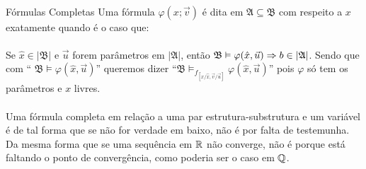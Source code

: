             \paragraph{}
            \begin{definition}{Fórmulas Completas}
                    Uma fórmula $\varphi(x;\vec{v})$ é dita  
                    em $\mathfrak A\subseteq\mathfrak{B}$ com respeito a $x$ 
                    exatamente quando é o caso que:
                \paragraph{}
                    Se $\hat{x}\in|\mathfrak{B}|$ e $\vec{u}$ forem parâmetros 
                    em $|\mathfrak{A}|$, então $\mathfrak{B}\vDash\varphi(\hat x, 
                    \vec u) \Rightarrow b\in|\mathfrak{A}|$. Sendo que com ``
                    $\mathfrak{B}\vDash\varphi(\hat x, \vec u)$'' queremos dizer
                    ``$\mathfrak{B}\vDash_{f_{[x\slash\hat x, \vec v\slash\vec u]}}\varphi(\hat x, \vec u)$''
                    pois $\varphi$ só tem os parâmetros e $x$ livres.
                \paragraph{}
                    Uma fórmula completa em relação a uma par estrutura-substrutura 
                    e um variável é de tal forma que se não for verdade em baixo,
                    não é por falta de testemunha. Da mesma forma que se uma sequência 
                    em $\mathbb{R}$ não converge, não é porque está faltando o ponto de 
                    convergência, como poderia ser o caso em $\mathbb{Q}$. 
            \end{definition}
